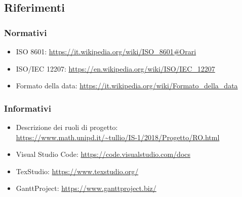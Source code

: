 \subsection{Riferimenti}

    \subsubsection{Normativi}	\label{rifnorma}
    \begin{itemize}
    	\item ISO 8601: \url{https://it.wikipedia.org/wiki/ISO\_8601#Orari}
    	\item ISO/IEC 12207: \url{https://en.wikipedia.org/wiki/ISO/IEC_12207}
    	\item Formato della data: \url{https://it.wikipedia.org/wiki/Formato\_della\_data}
    \end{itemize}

    \subsubsection{Informativi}	\label{rifinfo}
    \begin{itemize}
        \item Descrizione dei ruoli di progetto: \\\url{https://www.math.unipd.it/~tullio/IS-1/2018/Progetto/RO.html}
        \item Visual Studio Code: \url{https://code.visualstudio.com/docs}
        \item TexStudio: \url{https://www.texstudio.org/}
        \item GanttProject: \url{https://www.ganttproject.biz/}
	\end{itemize}
